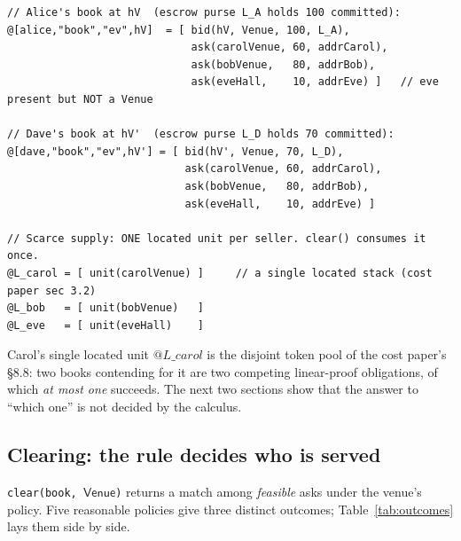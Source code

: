 \documentclass[11pt]{article}
\theoremstyle{definition}
\newcommand{\Venue}{\textsf{Venue}}
\begin{document}
\begin{lstlisting}
// Alice's book at hV  (escrow purse L_A holds 100 committed):
@[alice,"book","ev",hV]  = [ bid(hV, Venue, 100, L_A),
                             ask(carolVenue, 60, addrCarol),
                             ask(bobVenue,   80, addrBob),
                             ask(eveHall,    10, addrEve) ]   // eve present but NOT a Venue

// Dave's book at hV'  (escrow purse L_D holds 70 committed):
@[dave,"book","ev",hV'] = [ bid(hV', Venue, 70, L_D),
                            ask(carolVenue, 60, addrCarol),
                            ask(bobVenue,   80, addrBob),
                            ask(eveHall,    10, addrEve) ]

// Scarce supply: ONE located unit per seller. clear() consumes it once.
@L_carol = [ unit(carolVenue) ]     // a single located stack (cost paper sec 3.2)
@L_bob   = [ unit(bobVenue)   ]
@L_eve   = [ unit(eveHall)    ]
\end{lstlisting}

\noindent Carol's single located unit $@L\_carol$ is the disjoint token pool of the cost paper's
\S8.8: two books contending for it are two competing linear-proof obligations, of which \emph{at most
one} succeeds. The next two sections show that the answer to ``which one'' is not decided by the
calculus.

\subsection{Clearing: the rule decides who is served}\label{sec:rule}
\texttt{clear(book, $\Venue$)} returns a match among \emph{feasible} asks under the venue's policy.
Five reasonable policies give three distinct outcomes; Table~\ref{tab:outcomes} lays them side by side.
\end{document}
